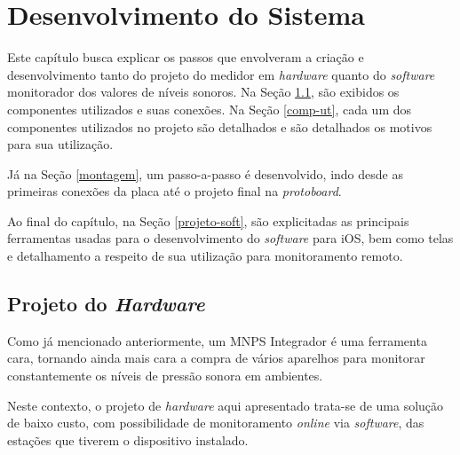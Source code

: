 \documentclass[
    12pt,               %
    openright,          %
    oneside,
    a4paper,            
    english,            %
    brazil              %
    ]{abntex2}
\begin{document}
\chapter{Desenvolvimento do Sistema}\label{projeto}

Este capítulo busca explicar os passos que envolveram a criação e desenvolvimento tanto do projeto do medidor em \textit{hardware} quanto do \textit{software} monitorador dos valores de níveis sonoros. Na Seção \ref{proj-hard}, são exibidos os componentes utilizados e suas conexões. Na Seção \ref{comp-ut}, cada um dos componentes utilizados no projeto são detalhados e são detalhados os motivos para sua utilização.

Já na Seção \ref{montagem}, um passo-a-passo é desenvolvido, indo desde as primeiras conexões da placa até o projeto final na \textit{protoboard}.

Ao final do capítulo, na Seção \ref{projeto-soft}, são explicitadas as principais ferramentas usadas para o  desenvolvimento do \textit{software} para iOS, bem como telas e detalhamento a respeito de sua utilização para monitoramento remoto.

\section{Projeto do \textit{Hardware}}\label{proj-hard}

Como já mencionado anteriormente, um MNPS Integrador é uma ferramenta cara, tornando ainda mais cara a compra de vários aparelhos para monitorar constantemente os níveis de pressão sonora em ambientes. 

Neste contexto, o projeto de \textit{hardware} aqui apresentado trata-se de uma solução de baixo custo, com possibilidade de monitoramento \textit{online} via \textit{software}, das estações que tiverem o dispositivo instalado.
\end{document}
